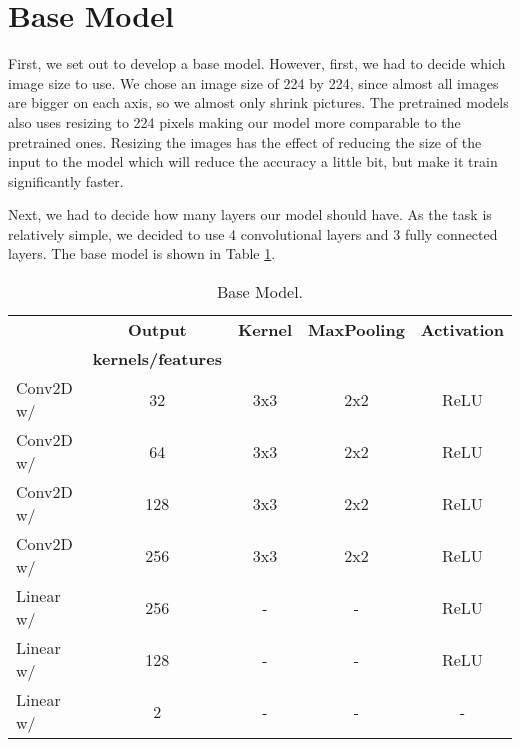 \section{Base Model}
First, we set out to develop a base model. However, first, we had to decide which image size to use.
We chose an image size of 224 by 224, since almost all images are bigger on each axis, so we almost only shrink pictures.
The pretrained models also uses resizing to 224 pixels making our model more comparable to the pretrained ones.
Resizing the images has the effect of reducing the size of the input to the model which will reduce the accuracy a little bit, but make it train significantly faster.

Next, we had to decide how many layers our model should have.
As the task is relatively simple, we decided to use 4 convolutional layers and 3 fully connected layers.
The base model is shown in Table \ref{tab:base_model}.
\begin{table}[H]
    \vspace*{-0.5cm}
    \centering
    \begin{tabular}{|l|c|c|c|c|}
    \hline
                & \textbf{Output}           & \textbf{Kernel}   & \textbf{MaxPooling}   & \textbf{Activation}   \\ 
                & \textbf{kernels/features} &                   &   &   \\ \hline
    Conv2D w/   & 32                        & 3x3                   & 2x2                   & ReLU                  \\ \hline
    Conv2D w/   & 64                        & 3x3                   & 2x2                   & ReLU                  \\ \hline
    Conv2D w/   & 128                       & 3x3                   & 2x2                   & ReLU                  \\ \hline
    Conv2D w/   & 256                       & 3x3                   & 2x2                   & ReLU                  \\ \hline
    Linear w/   & 256                       & -                     & -                     & ReLU                  \\ \hline
    Linear w/   & 128                       & -                     & -                     & ReLU                  \\ \hline
    Linear w/   & 2                         & -                     & -                     & -                     \\ \hline
    \end{tabular}
    \caption{Base Model.}
    \label{tab:base_model}
    \vspace*{-0.8cm}
\end{table}
